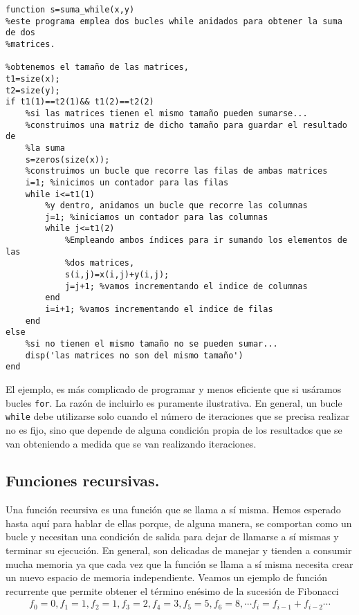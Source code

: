 \begin{verbatim}
function s=suma_while(x,y)
%este programa emplea dos bucles while anidados para obtener la suma de dos
%matrices.

%obtenemos el tamaño de las matrices,
t1=size(x);
t2=size(y);
if t1(1)==t2(1)&& t1(2)==t2(2)
    %si las matrices tienen el mismo tamaño pueden sumarse...
    %construimos una matriz de dicho tamaño para guardar el resultado de
    %la suma
    s=zeros(size(x));
    %construimos un bucle que recorre las filas de ambas matrices
    i=1; %inicimos un contador para las filas
    while i<=t1(1)
        %y dentro, anidamos un bucle que recorre las columnas
        j=1; %iniciamos un contador para las columnas
        while j<=t1(2)
            %Empleando ambos índices para ir sumando los elementos de las
            %dos matrices,
            s(i,j)=x(i,j)+y(i,j);
            j=j+1; %vamos incrementando el indice de columnas
        end
        i=i+1; %vamos incrementando el indice de filas
    end
else
    %si no tienen el mismo tamaño no se pueden sumar...
    disp('las matrices no son del mismo tamaño')
end
\end{verbatim}

El ejemplo, es más complicado de programar y menos eficiente que si usáramos bucles \texttt{for}. La razón de incluirlo es puramente ilustrativa. En general, un bucle \texttt{while} debe utilizarse solo cuando el número de iteraciones que se precisa realizar no es fijo, sino que depende de alguna condición propia de los resultados que se van obteniendo a medida que se van realizando iteraciones.

\subsection{Funciones recursivas.} 
Una función recursiva es una función que se llama a sí misma. Hemos esperado hasta aquí para hablar de ellas porque, de alguna manera, se comportan como un bucle y necesitan una condición de salida para dejar de llamarse a sí mismas y terminar su ejecución. En general, son delicadas de manejar y tienden a consumir mucha memoria ya que cada vez que la función se llama a sí misma necesita crear un nuevo espacio de memoria independiente. Veamos un ejemplo de función recurrente que permite obtener el término enésimo de la sucesión de Fibonacci  
\begin{align*}
f_0=0, f_1=1, f_2=1, f_3=2, f_4=3, f_5=5, f_6=8, \cdots f_i=f_{i-1}+f_{i-2} \cdots 
\end{align*}

